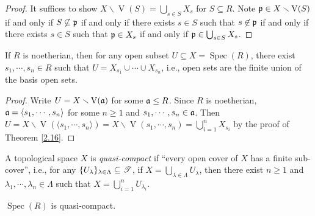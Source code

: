 \begin{proof}
    It suffices to show $X \smallsetminus \operatorname{V}(S) = \bigcup_{s \in S}X_s$ for $S \subseteq R$. Note $\mathfrak{p} \in X \smallsetminus \operatorname{V}(S)$ if and only if $S \not \subseteq \mathfrak{p}$ if and only if there exists $s \in S$ such that $s \not \in \mathfrak{p}$ if and only if there exists $s \in S$ such that $\mathfrak{p} \in X_s$ if and only if $\mathfrak{p} \in \bigcup_{s \in S}X_s$.
\end{proof}

\begin{proposition}\label{2.17}
    If $R$ is noetherian, then for any open subset $U \subseteq X = \operatorname{Spec}(R)$, there exist $s_1,\cdots,s_n \in R$ such that $U = X_{s_1} \cup \cdots \cup X_{s_n}$, i.e., open sets are the finite union of the basis open sets.
\end{proposition}

\begin{proof}
    Write $U = X \smallsetminus \operatorname{V}(\mathfrak{a})$ for some $\mathfrak{a} \leq R$. Since $R$ is noetherian, $\mathfrak{a} = \langle s_1,\cdots,s_n \rangle$ for some $n \geq 1$ and $s_1,\cdots,s_n \in \mathfrak{a}$. Then $U = X \smallsetminus \operatorname{V}(\langle s_1,\cdots,s_n \rangle) = X \smallsetminus \operatorname{V}(s_1,\cdots,s_n) = \bigcup_{i=1}^n X_{s_i}$ by the proof of Theorem \ref{2.16}.
\end{proof}

\begin{definition}\label{2.18}
    A topological space $X$ is \emph{quasi-compact} if ``every open cover of $X$ has a finite sub-cover'', i.e., for any $\{U_\lambda\}_{\lambda \in \Lambda} \subseteq \mathscr{T}$, if $X = \bigcup_{\lambda \in \Lambda} U_\lambda$, then there exist $n \geq 1$ and $\lambda_1,\cdots,\lambda_n \in \Lambda$ such that $X = \bigcup_{i=1}^n U_{\lambda_i}$.
\end{definition}

\begin{theorem}\label{2.19}
    $\operatorname{Spec}(R)$ is quasi-compact.
\end{theorem}

